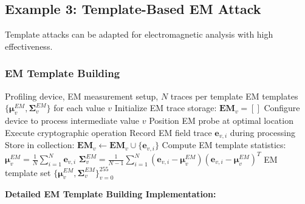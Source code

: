 \documentclass[11pt,a4paper]{article}
\theoremstyle{definition}
\begin{document}
\subsection{Example 3: Template-Based EM Attack}

Template attacks can be adapted for electromagnetic analysis with high effectiveness.

\subsubsection{EM Template Building}

\begin{algorithm}
\caption{EM Template Building Phase}
\begin{algorithmic}[1]
\REQUIRE Profiling device, EM measurement setup, $N$ traces per template
\ENSURE EM templates $\{\boldsymbol{\mu}_v^{EM}, \boldsymbol{\Sigma}_v^{EM}\}$ for each value $v$
    \STATE Initialize EM trace storage: $\mathbf{EM}_v = []$
        \STATE Configure device to process intermediate value $v$
        \STATE Position EM probe at optimal location
        \STATE Execute cryptographic operation
        \STATE Record EM field trace $\mathbf{e}_{v,i}$ during processing
        \STATE Store in collection: $\mathbf{EM}_v \leftarrow \mathbf{EM}_v \cup \{\mathbf{e}_{v,i}\}$
    \ENDFOR
    \STATE Compute EM template statistics:
    \STATE $\boldsymbol{\mu}_v^{EM} = \frac{1}{N} \sum_{i=1}^N \mathbf{e}_{v,i}$
    \STATE $\boldsymbol{\Sigma}_v^{EM} = \frac{1}{N-1} \sum_{i=1}^N (\mathbf{e}_{v,i} - \boldsymbol{\mu}_v^{EM})(\mathbf{e}_{v,i} - \boldsymbol{\mu}_v^{EM})^T$
\ENDFOR
\RETURN EM template set $\{\boldsymbol{\mu}_v^{EM}, \boldsymbol{\Sigma}_v^{EM}\}_{v=0}^{255}$
\end{algorithmic}
\end{algorithm}

\textbf{Detailed EM Template Building Implementation:}
\end{document}
